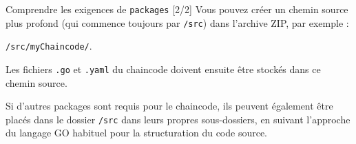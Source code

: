 \documentclass[presentation]{beamer}
\begin{document}
\begin{frame}[fragile,label={sec:org90d1a2d}]{Comprendre les exigences de \texttt{packages} [2/2]}
 Vous pouvez créer un chemin source plus profond (qui commence toujours par \texttt{/src}) dans l'archive ZIP, 
par exemple :

\texttt{/src/myChaincode/}.

Les fichiers \texttt{.go} et \texttt{.yaml} du chaincode doivent ensuite être stockés dans ce chemin source.

Si d'autres packages sont requis pour le chaincode, ils peuvent également être placés dans le 
dossier \texttt{/src} dans leurs propres sous-dossiers, en suivant l'approche du langage GO habituel 
pour la structuration du code source.
\end{frame}
\end{document}

